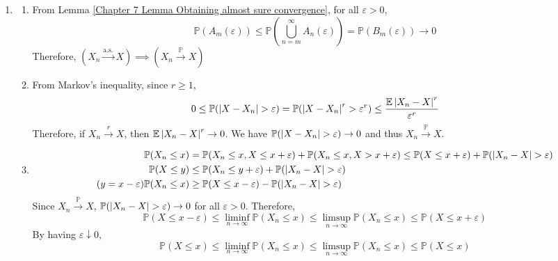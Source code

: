 \documentclass{huhtakm-template-book}
\newcommand{\prob}{\mathbb{P}}
\newcommand{\expect}{\mathbb{E}}
\begin{document}
\begin{proofing}
    \begin{enumerate}
        \item \begin{enumerate}
            \item From Lemma \ref{Chapter 7 Lemma Obtaining almost sure convergence}, for all $\varepsilon>0$,
            \begin{equation*}
                \prob(A_{m}(\varepsilon))\leq\prob\left(\bigcup_{n=m}^{\infty}A_{n}(\varepsilon)\right)=\prob(B_{m}(\varepsilon))\to 0
            \end{equation*}
            Therefore, $(X_{n}\xrightarrow{\text{a.s.}}X)\implies(X_{n}\xrightarrow{\prob}X)$
            \item From Markov's inequality, since $r\geq 1$,
            \begin{equation*}
                0\leq\prob(\abs{X-X_{n}}>\varepsilon)=\prob(\abs{X-X_{n}}^{r}>\varepsilon^{r})\leq\frac{\expect\abs{X_{n}-X}^{r}}{\varepsilon^{r}}
            \end{equation*}
            Therefore, if $X_{n}\xrightarrow{r}X$, then $\expect\abs{X_{n}-X}^{r}\to 0$. We have $\prob(\abs{X-X_{n}}>\varepsilon)\to 0$ and thus $X_{n}\xrightarrow{\prob}X$.
            \item 
            \begin{align*}
                \prob(X_{n}\leq x)&=\prob(X_{n}\leq x,X\leq x+\varepsilon)+\prob(X_{n}\leq x,X>x+\varepsilon)\leq\prob(X\leq x+\varepsilon)+\prob(\abs{X_{n}-X}>\varepsilon)\\
                \prob(X\leq y)&\leq\prob(X_{n}\leq y+\varepsilon)+\prob(\abs{X_{n}-X}>\varepsilon)\\
                \tag{$y=x-\varepsilon$}
                \prob(X_{n}\leq x)
                &\geq\prob(X\leq x-\varepsilon)-\prob(\abs{X_{n}-X}>\varepsilon)
            \end{align*}
            Since $X_{n}\xrightarrow{\prob}X$, $\prob(\abs{X_{n}-X}>\varepsilon)\to 0$ for all $\varepsilon>0$. Therefore,
            \begin{equation*}
                \prob(X\leq x-\varepsilon)\leq\liminf_{n\to\infty}\prob(X_{n}\leq x)\leq\limsup_{n\to\infty}\prob(X_{n}\leq x)\leq\prob(X\leq x+\varepsilon)
            \end{equation*}
            By having $\varepsilon\downarrow 0$,
            \begin{equation*}
                \prob(X\leq x)\leq\liminf_{n\to\infty}\prob(X_{n}\leq x)\leq\limsup_{n\to\infty}\prob(X_{n}\leq x)\leq\prob(X\leq x)

\end{equation*}
\end{enumerate}
\end{enumerate}
\end{proofing}
\end{document}
